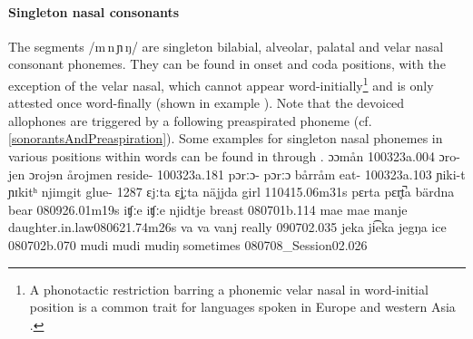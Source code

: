 \FB

\paragraph{Singleton nasal consonants}
The segments /m\,n\,ɲ\,ŋ/ are singleton bilabial, alveolar, palatal and velar nasal consonant phonemes. 
They can be found in onset and coda positions, with the exception of the velar nasal, which cannot appear word-initially\footnote{A phonotactic restriction barring a phonemic velar nasal in word-initial position is a common trait for languages spoken in Europe and western Asia \citep[cf.][]{Anderson2008a}.} 
and is only attested once word-finally (shown in example ). 
Note that the devoiced allophones are triggered by a following preaspirated phoneme (cf. \SEC\ref{sonorantsAndPreaspiration}).
Some examples for singleton nasal phonemes in various positions within words can be found in  through .  
			{ɔ}{ɔ}{mån}	{}			{100323a}{.004}
		{ɔro-jen}	{ɔrojɘn}	{årojmen}	{reside-}		{100323a}{.181}
				{pɔrːɔ-\Bf{m}}	{pɔrːɔ}	{bårråm}	{eat-}			{100323a}{.103}
				{ɲi\Bf{m}ki-t}		{ɲɪkitʰ}	{njimgit}	{glue-}			{1287}
			{\Bf{n}ɛjːta}		{ɛj̥ːta}		{näjjda}	{girl\BS{}}		{110415}{.06m31s}
			{pɛrta}		{pɛr̥t̚a}		{bärdna}	{bear\BS{}}		{080926}{.01m19s}
		{iʧːe}		{iʧːe}		{njidtje}	{breast\BS{}}	{080701b}{.114}
	{mae}		{mae}		{manje}	{daughter.in.law\BS{}}{080621}{.74m26s}
				{va\Bf{ɲ}}		{va}		{vanj}	{really}					{090702}{.035}
			{jeka}		{ji͡eka}		{jegŋa}	{ice\BS{}}		{080702b}{.070}
	{mudi}		{mudi}		{mudiŋ}	{sometimes}			{080708\_Session02}{.026}%

